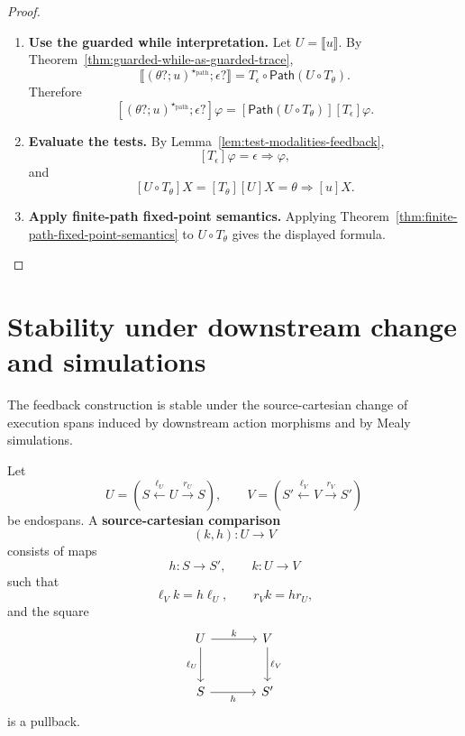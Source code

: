 \begin{proof}
\begin{enumerate}
  \item \textbf{Use the guarded while interpretation.}
  Let \(U=\llbracket u\rrbracket\). By
  Theorem~\ref{thm:guarded-while-as-guarded-trace},
  \[
    \llbracket
      (\theta?;u)^{\star_{\mathrm{path}}};\epsilon?
    \rrbracket
    =
    T_\epsilon\circ\mathsf{Path}(U\circ T_\theta).
  \]
  Therefore
  \[
    \left[
      (\theta?;u)^{\star_{\mathrm{path}}};\epsilon?
    \right]\varphi
    =
    [\mathsf{Path}(U\circ T_\theta)]
    [T_\epsilon]\varphi.
  \]

  \item \textbf{Evaluate the tests.}
  By Lemma~\ref{lem:test-modalities-feedback},
  \[
    [T_\epsilon]\varphi
    =
    \epsilon\Rightarrow\varphi,
  \]
  and
  \[
    [U\circ T_\theta]X
    =
    [T_\theta][U]X
    =
    \theta\Rightarrow[u]X.
  \]

  \item \textbf{Apply finite-path fixed-point semantics.}
  Applying Theorem~\ref{thm:finite-path-fixed-point-semantics} to
  \(U\circ T_\theta\) gives the displayed formula.
\end{enumerate}
\end{proof}

\section{Stability under downstream change and simulations}
\label{sec:feedback-stability}

The feedback construction is stable under the source-cartesian change of
execution spans induced by downstream action morphisms and by Mealy
simulations.

\begin{definition}
\label{def:source-cartesian-comparison-execution-endospans}
Let
\[
  U=
  \left(
    S\xleftarrow{\ell_U}U\xrightarrow{r_U}S
  \right),
  \qquad
  V=
  \left(
    S'\xleftarrow{\ell_V}V\xrightarrow{r_V}S'
  \right)
\]
be endospans. A \textbf{source-cartesian comparison}
\[
  (k,h):U\longrightarrow V
\]
consists of maps
\[
  h:S\to S',
  \qquad
  k:U\to V
\]
such that
\[
  \ell_V k=h\ell_U,
  \qquad
  r_V k=hr_U,
\]
and the square
\[
\begin{tikzcd}[column sep=large,row sep=large]
  U
    \ar[r,"k"]
    \ar[d,"\ell_U"']
  &
  V
    \ar[d,"\ell_V"]
  \\
  S
    \ar[r,"h"']
  &
  S'
\end{tikzcd}
\]
is a pullback.
\end{definition}

